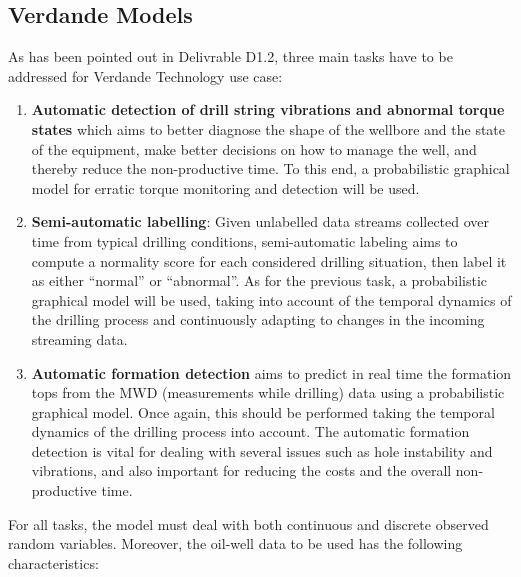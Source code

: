 
\subsection{Verdande Models}
\label{Section:VerdandeModels}



As has been pointed out in Delivrable D1.2, three main tasks have to be addressed for Verdande Technology use case:

\begin{enumerate}

\item \textbf{Automatic detection of drill string vibrations and abnormal torque states} which aims to better diagnose the shape of the wellbore and the state of the equipment, make better decisions on how to manage the well, and thereby reduce the non-productive time. To this end, a probabilistic graphical model for erratic torque monitoring and detection will be used.


\item \textbf{Semi-automatic labelling}: Given unlabelled data streams collected over time from typical drilling conditions, semi-automatic labeling aims to compute a normality score for each considered drilling situation, then label it as either ``normal'' or ``abnormal''. As for the previous task, a probabilistic graphical model will be used, taking into account of the temporal dynamics of the drilling process and continuously adapting to changes in the incoming streaming data. %

\item \textbf{Automatic formation detection} aims to predict in real time the formation tops from the MWD (measurements while drilling) data using a probabilistic graphical model. Once again, this should be performed taking the temporal dynamics of the drilling process 
into account. The automatic formation detection is vital for dealing with several issues such as hole instability and vibrations, and also important for reducing the costs and the overall non-productive time.
\end{enumerate}

For all tasks, the model must deal with both continuous and discrete observed random variables. Moreover, the oil-well data to be used has the following characteristics: 


